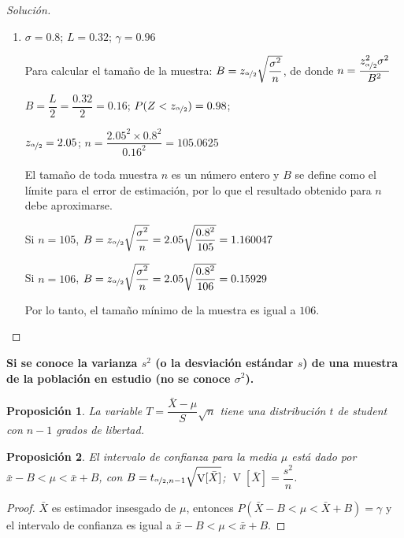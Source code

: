 \documentclass[a5paper,doc,10pt,noapacite]{apa6}
\DeclareMathOperator{\Var}{V}
\newtheorem{proposicion}{Proposición}
\begin{document}
{{\begin{proof}[Solución]
\begin{enumerate}
		\(\bar{x}-B<\mu<\bar{x}+B\); \(B=z_{\nicefrac{\alpha}{2}}\sqrt{\Var[\bar{X}]}\); \(\Var[\bar{X}]=\dfrac{\sigma^2}{n}\); \(B=z_{\nicefrac{\alpha}{2}}\sqrt{\dfrac{\sigma^2}{n}}\); \(P(Z<z_{\nicefrac{\alpha}{2}})=0.965\); \(z_{\nicefrac{\alpha}{2}}=1.81\)
		
		\(B=1.81\sqrt{\dfrac{0.8^2}{73}}=1.69\); \(4.1-0.169<\mu<4.1+0.169\); \(3.931<\mu<4.269\)
		
		\vspace{1\baselineskip}
		\item \(\sigma=0.8\); \(L=0.32\); \(\gamma=0.96\)
		
		Para calcular el tamaño de la muestra: \(B=z_{\nicefrac{\alpha}{2}}\sqrt{\dfrac{\sigma^2}{n}}\), de donde \(n=\dfrac{z_{\nicefrac{\alpha}{2}}^2\sigma^2}{B^2}\)
		
		\(B=\dfrac{L}{2}=\dfrac{0.32}{2}=0.16\); \(P(Z<z_{\nicefrac{\alpha}{2}})=0.98\);
		
		\(z_{\nicefrac{\alpha}{2}}=2.05\); \(n=\dfrac{2.05^2 \times 0.8^2}{0.16^2}=105.0625\)
		
		El tamaño de toda muestra \(n\) es un número entero y \(B\) se define como el límite para el error de estimación, por lo que el resultado obtenido para \(n\) debe aproximarse.
		
		Si \(n=105\), \(B=z_{\nicefrac{\alpha}{2}}\sqrt{\dfrac{\sigma^2}{n}}=2.05\sqrt{\dfrac{0.8^2}{105}}=1.160047\)
		
		Si \(n=106\), \(B=z_{\nicefrac{\alpha}{2}}\sqrt{\dfrac{\sigma^2}{n}}=2.05\sqrt{\dfrac{0.8^2}{106}}=0.15929\)
		
		Por lo tanto, el tamaño mínimo de la muestra es igual a \(106\).			\qedhere
	\end{enumerate}
\end{proof}



\vspace{0.75\baselineskip}
	\textbf{Si se conoce la varianza \(s^2\) (o la desviación estándar \(s\)) de una muestra de la población en estudio (no se conoce \(\sigma^2\)).}\newline

\begin{proposicion}\label{prop-5.1}
	La variable \(T=\dfrac{\bar{X}-\mu}{S}\sqrt{n}\) tiene una distribución \(t\) de student con \(n-1\) grados de libertad.
\end{proposicion}


\begin{proposicion}\label{prop-5.2}
	El intervalo de confianza para la media \(\mu\) está dado por \(\bar{x}-B<\mu<\bar{x}+B\), con \(B=t_{\nicefrac{\alpha}{2},n-1} \sqrt{\Var[\bar{X}]}\); \(\Var[\bar{X}]=\dfrac{s^2}{n}\).
\end{proposicion}
\begin{proof}
	\(\bar{X}\) es estimador insesgado de \(\mu\), entonces \(P(\bar{X}-B<\mu<\bar{X}+B)=\gamma\) y el intervalo de confianza es igual a \(\bar{x}-B<\mu<\bar{x}+B\).
	

\end{proof}}}
\end{document}
